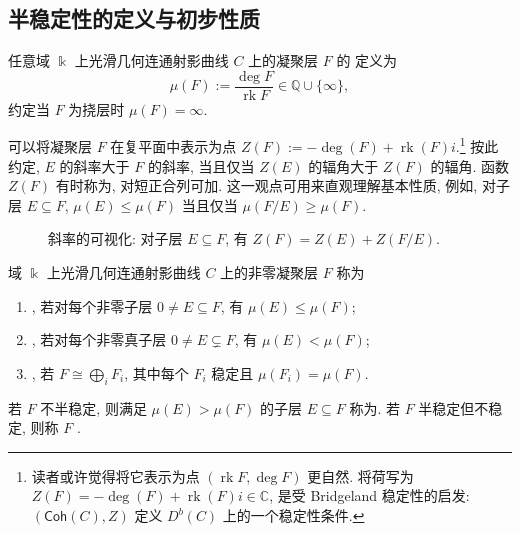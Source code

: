 \subsection{半稳定性的定义与初步性质}\label{src:9.1.2-subsection}
\begin{definition}[斜率]\label{src:9.1.8}
任意域 $\Bbbk$ 上光滑几何连通射影曲线 $C$ 上的凝聚层 $F$ 的 定义为
\[
\mu(F):=\frac{\deg F}{\operatorname{rk}F}\in\mathbb Q\cup\{\infty\},
\]
约定当 $F$ 为挠层时 $\mu(F)=\infty$.
\end{definition}
\begin{remark}[斜率的可视化]\label{src:9.1.9}
可以将凝聚层 $F$ 在复平面中表示为点 $Z(F):=-\deg(F)+\operatorname{rk}(F)i$.\footnote{读者或许觉得将它表示为点 $(\operatorname{rk}F,\deg F)$ 更自然. 将荷写为 $Z(F)=-\deg(F)+\operatorname{rk}(F)i\in\mathbb C$, 是受 Bridgeland 稳定性的启发: $(\mathsf{Coh}(C),Z)$ 定义 $D^b(C)$ 上的一个稳定性条件.} 按此约定, $E$ 的斜率大于 $F$ 的斜率, 当且仅当 $Z(E)$ 的辐角大于 $Z(F)$ 的辐角. 函数 $Z(F)$ 有时称为, 对短正合列可加. 这一观点可用来直观理解基本性质, 例如, 对子层 $E\subseteq F$, $\mu(E)\leq\mu(F)$ 当且仅当 $\mu(F/E)\geq\mu(F)$.
\end{remark}
\begin{figure}[H]
\centering
{}
\caption{斜率的可视化: 对子层 $E\subseteq F$, 有 $Z(F)=Z(E)+Z(F/E)$.}\label{src:9.1.10}
\end{figure}
\begin{definition}\label{src:9.1.11}
域 $\Bbbk$ 上光滑几何连通射影曲线 $C$ 上的非零凝聚层 $F$ 称为
\begin{enumerate}[(1)]
\item {}, 若对每个非零子层 $0\ne E\subseteq F$, 有 $\mu(E)\leq\mu(F)$;
\item {}, 若对每个非零真子层 $0\ne E\subsetneq F$, 有 $\mu(E)<\mu(F)$;
\item {}, 若 $F\cong\bigoplus_iF_i$, 其中每个 $F_i$ 稳定且 $\mu(F_i)=\mu(F)$.
\end{enumerate}
若 $F$ 不半稳定, 则满足 $\mu(E)>\mu(F)$ 的子层 $E\subseteq F$ 称为. 若 $F$ 半稳定但不稳定, 则称 $F$ .
\end{definition}
